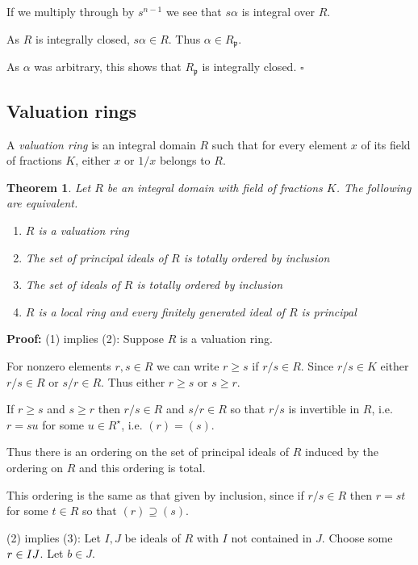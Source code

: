 \documentclass[10pt]{article}
\newcommand{\qed}{\square}
\newtheorem{theorem}{Theorem}[section]
\newenvironment{definition}[1][Definition]{\begin{trivlist}
\item[\hskip \labelsep {\bfseries #1}]}{\end{trivlist}}
\begin{document}
If we multiply through by $s^{n-1}$ we see that $s\alpha$ is integral over $R$.

As $R$ is integrally closed, $s\alpha \in R$. Thus $\alpha \in R_{\mathfrak{p}}$.

As $\alpha$ was arbitrary, this shows that $R_{\mathfrak{p}}$ is integrally closed. $\qed$

\subsection{Valuation rings}

\begin{definition}
A \emph{valuation ring} is an integral domain $R$ such that for every element $x$ of its field of fractions $K$, either $x$ or $1/x$ belongs to $R$.
\end{definition}

\begin{theorem}
Let $R$ be an integral domain with field of fractions $K$. The following are equivalent.
\begin{enumerate}
\item $R$ is a valuation ring
\item The set of principal ideals of $R$ is totally ordered by inclusion
\item The set of ideals of $R$ is totally ordered by inclusion
\item $R$ is a local ring and every finitely generated ideal of $R$ is principal
\end{enumerate}
\end{theorem}

\textbf{Proof:}
(1) implies (2): Suppose $R$ is a valuation ring.

For nonzero elements $r, s \in R$ we can write $r \geq s$ if $r/s \in R$. Since $r/s \in K$ either $r/s \in R$ or $s/r \in R$. Thus either $r \geq s$ or $s \geq r$.

If $r \geq s$ and $s \geq r$ then $r/s \in R$ and $s/r \in R$ so that $r/s$ is invertible in $R$, i.e. $r = su$ for some $u \in R^\star$, i.e. $(r) = (s)$.

Thus there is an ordering on the set of principal ideals of $R$ induced by the ordering on $R$ and this ordering is total.

This ordering is the same as that given by inclusion, since if $r/s \in R$ then $r = st$ for some $t \in R$ so that $(r) \supseteq (s)$.

(2) implies (3): Let $I, J$ be ideals of $R$ with $I$ not contained in $J$. Choose some $r \in I\\J$. Let $b \in J$.
\end{document}
